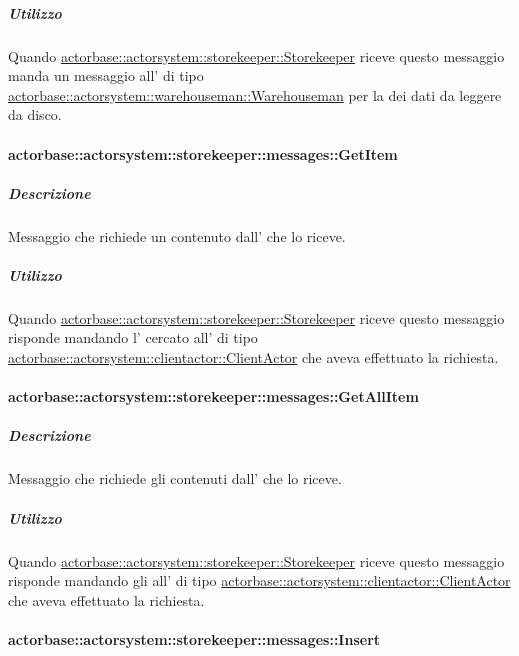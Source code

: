 \documentclass{scalatekids-article}
\begin{document}
\subparagraph{Utilizzo}

Quando \hyperref[sec:actorbase::actorsystem::storekeeper::Storekeeper]{actorbase::actorsystem::storekeeper::Storekeeper}
riceve questo messaggio manda un messaggio all' di tipo
\hyperref[sec:actorbase::actorsystem::warehouseman::Warehouseman]{actorbase::\allowbreak{}actorsystem::\allowbreak{}warehouseman::\allowbreak{}Warehouseman}
per la  dei dati da leggere da disco.

\paragraph{actorbase::actorsystem::storekeeper::messages::GetItem}
\label{sec:actorbase::actorsystem::storekeeper::messages::GetItem}

\subparagraph{Descrizione}

Messaggio che richiede un  contenuto dall'
 che lo riceve.

\subparagraph{Utilizzo}

Quando \hyperref[sec:actorbase::actorsystem::storekeeper::Storekeeper]{actorbase::actorsystem::storekeeper::Storekeeper}
riceve questo messaggio risponde mandando l' cercato all' di tipo
\hyperref[sec:actorbase::actorsystem::clientactor::ClientActor]{actorbase::actorsystem::clientactor::ClientActor}
che aveva effettuato la richiesta.

\paragraph{actorbase::actorsystem::storekeeper::messages::GetAllItem}
\label{sec:actorbase::actorsystem::storekeeper::messages::GetAllItem}

\subparagraph{Descrizione}

Messaggio che richiede gli  contenuti dall'
 che lo riceve.

\subparagraph{Utilizzo}

Quando \hyperref[sec:actorbase::actorsystem::storekeeper::Storekeeper]{actorbase::actorsystem::storekeeper::Storekeeper}
riceve questo messaggio risponde mandando gli  all' di tipo
\hyperref[sec:actorbase::actorsystem::clientactor::ClientActor]{actorbase::actorsystem::clientactor::ClientActor}
che aveva effettuato la richiesta.

\paragraph{actorbase::actorsystem::storekeeper::messages::Insert}
\label{sec:actorbase::actorsystem::storekeeper::messages::Insert}
\end{document}
